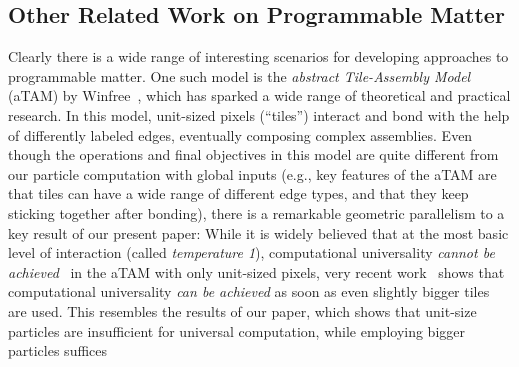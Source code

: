 \subsection{Other Related Work on Programmable Matter}
Clearly there is a wide range of interesting scenarios for developing approaches to programmable matter.
One such model is the \emph{abstract Tile-Assembly Model} (aTAM) by Winfree~\cite{Winf98,WLWS98,LaWiRe99}, which has 
sparked a wide range of theoretical and practical research. In this model, unit-sized pixels (``tiles'')
interact and bond with the help of differently labeled edges, eventually composing complex assemblies.
Even though the operations and final objectives in this model are quite different from our particle computation with global
inputs (e.g., key features of the aTAM are that tiles can have a wide range of different edge types, and
that they keep sticking together after bonding), there is
a remarkable geometric parallelism to a key result of our present paper:
While it is widely believed that at the most basic level of interaction (called {\em temperature 1}),
computational universality {\em cannot be achieved}~\cite{LSAT1,ManuchTemp1,IUNeedsCoop} in the aTAM with only unit-sized pixels, 
very recent work~\cite{fhp+-ucapt-15} shows that computational universality {\em can be achieved} as soon as even slightly bigger tiles are used. 
This resembles the results of our paper, which shows that unit-size particles are insufficient for universal computation, while employing bigger particles suffices

